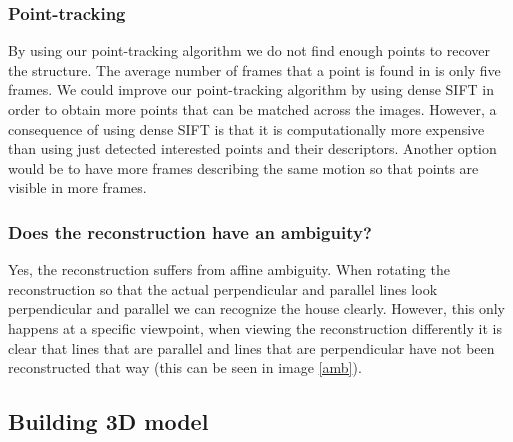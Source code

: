 \documentclass[12pt]{amsart}
\begin{document}
\subsubsection{Point-tracking}
By using our point-tracking algorithm we do not find enough points to recover the structure. The average number of frames that a point is found in is only five frames. We could improve our point-tracking algorithm by using dense SIFT in order to obtain more points that can be matched across the images. However, a consequence of using dense SIFT is that it is computationally more expensive than using just detected interested points and their descriptors. Another option would be to have more frames describing the same motion so that points are visible in more frames.

\subsubsection{Does the reconstruction have an ambiguity?} 
Yes, the reconstruction suffers from affine ambiguity. When rotating the reconstruction so that the actual perpendicular and parallel lines look perpendicular and parallel we can recognize the house clearly. However, this only happens at a specific viewpoint, when viewing the reconstruction differently it is clear that lines that are parallel and lines that are perpendicular have not been reconstructed that way (this can be seen in image \ref{amb}). \subsection{Building 3D model}

\end{document}

